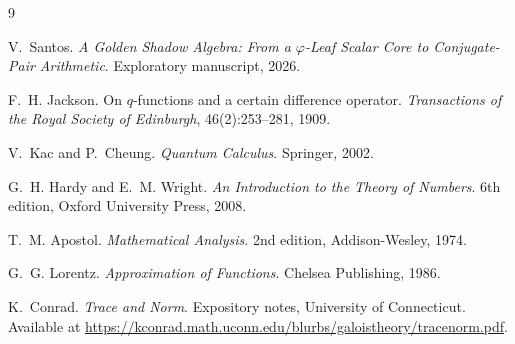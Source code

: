 \documentclass[11pt]{article}
\begin{document}
\begin{thebibliography}{9}

V.~Santos.
\newblock \emph{A Golden Shadow Algebra: From a $\varphi$-Leaf Scalar Core to Conjugate-Pair Arithmetic}.
\newblock Exploratory manuscript, 2026.

F.~H. Jackson.
\newblock On $q$-functions and a certain difference operator.
\newblock \emph{Transactions of the Royal Society of Edinburgh}, 46(2):253--281, 1909.

V.~Kac and P.~Cheung.
\newblock \emph{Quantum Calculus}.
\newblock Springer, 2002.

G.~H. Hardy and E.~M. Wright.
\newblock \emph{An Introduction to the Theory of Numbers}.
\newblock 6th edition, Oxford University Press, 2008.

T.~M. Apostol.
\newblock \emph{Mathematical Analysis}.
\newblock 2nd edition, Addison-Wesley, 1974.

G.~G. Lorentz.
\newblock \emph{Approximation of Functions}.
\newblock Chelsea Publishing, 1986.

K.~Conrad.
\newblock \emph{Trace and Norm}.
\newblock Expository notes, University of Connecticut. Available at \url{https://kconrad.math.uconn.edu/blurbs/galoistheory/tracenorm.pdf}.

\end{thebibliography}
\end{document}
